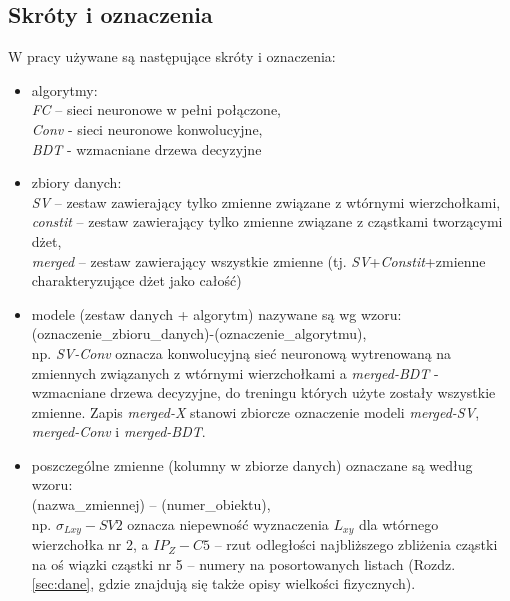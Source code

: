\begin{appendices}
\section{Skróty i oznaczenia}
\label{sec:app:skroty}
W pracy używane są następujące skróty i oznaczenia: 
\begin{itemize}
	\item algorytmy: \\ \textit{FC} -- sieci neuronowe w pełni połączone,\\ \textit{Conv} - sieci neuronowe konwolucyjne,\\ \textit{BDT} - wzmacniane drzewa decyzyjne
	\item zbiory danych: \\ \textit{SV} -- zestaw zawierający tylko zmienne związane z wtórnymi wierzchołkami,\\ \textit{constit} -- zestaw zawierający tylko zmienne związane z cząstkami tworzącymi dżet,\\ \textit{merged} -- zestaw zawierający wszystkie zmienne (tj. \textit{SV}+\textit{Constit}+zmienne charakteryzujące dżet jako całość)
	\item modele (zestaw danych + algorytm) nazywane są wg wzoru: \\ (oznaczenie\_zbioru\_danych)-(oznaczenie\_algorytmu), \\np. \textit{SV-Conv} oznacza konwolucyjną sieć neuronową wytrenowaną na zmiennych związanych z wtórnymi wierzchołkami a \textit{merged-BDT} - wzmacniane drzewa decyzyjne, do treningu których użyte zostały wszystkie zmienne. Zapis \textit{merged-X} stanowi zbiorcze oznaczenie modeli \textit{merged-SV}, \textit{merged-Conv} i \textit{merged-BDT}.
	\item poszczególne zmienne (kolumny w zbiorze danych) oznaczane są według wzoru: \\ (nazwa\_zmiennej) -- (numer\_obiektu), \\np. $\sigma_{Lxy} - SV2$ oznacza niepewność wyznaczenia $L_{xy}$ dla wtórnego wierzchołka nr 2, a $IP_Z - C5$ -- rzut odległości najbliższego zbliżenia cząstki na oś wiązki cząstki nr 5 -- numery na posortowanych listach (Rozdz. \ref{sec:dane}, gdzie znajdują się także opisy wielkości fizycznych).
\end{itemize} 


\end{appendices}
